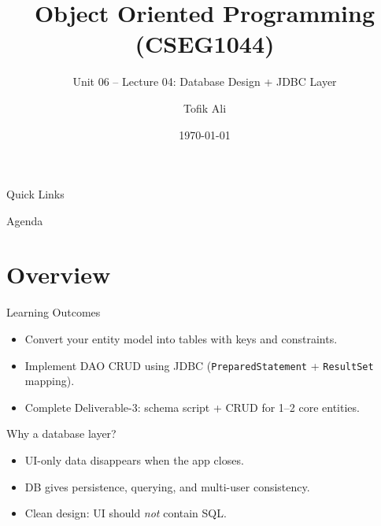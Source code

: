 \documentclass{beamer}
\title[OOPS with Java]{Object Oriented Programming (CSEG1044)}
\subtitle{Unit 06 -- Lecture 04: Database Design + JDBC Layer}
\author{Tofik Ali}
\institute{School of Computer Science, UPES Dehradun}
\date{\today}
\begin{document}
\begin{frame}[fragile]
  \titlepage
  \vspace{0.5em}
  \slidesources{\OOPSUnitVISources}
\end{frame}

\begin{frame}{Quick Links}
  \centering
  \hyperlink{sec:overview}{}\hspace{0.6em}
  \hyperlink{sec:concepts}{}\hspace{0.6em}
  \hyperlink{sec:demo}{}\hspace{0.6em}
  \hyperlink{sec:summary}{}
  \slidesources{\OOPSUnitVISources}
\end{frame}

\begin{frame}{Agenda}
  \tableofcontents
  \slidesources{\OOPSUnitVISources}
\end{frame}

\section{Overview}
\label{sec:overview}

\begin{frame}{Learning Outcomes}
  \begin{itemize}[<+->]
    \item Convert your entity model into tables with keys and constraints.
    \item Implement DAO CRUD using JDBC (\texttt{PreparedStatement} + \texttt{ResultSet} mapping).
    \item Complete Deliverable-3: schema script + CRUD for 1--2 core entities.
  \end{itemize}
  \slidesources{\OOPSUnitVISources}
\end{frame}

\begin{frame}{Why a database layer?}
  \begin{itemize}[<+->]
    \item UI-only data disappears when the app closes.
    \item DB gives persistence, querying, and multi-user consistency.
    \item Clean design: UI should \textit{not} contain SQL.
  \end{itemize}
  \slidesources{\OOPSUnitVISources}
\end{frame}
\end{document}
